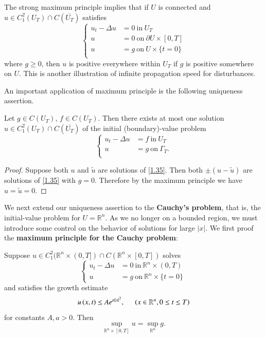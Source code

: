 The strong maximum principle implies that if $U$ is connected and $u\in C_1^2(U_T)\cap C(\overline{U_T})$ satisfies 
\begin{equation}\label{1.35}
\left\{ \begin{aligned}
	u_t-\Delta u&=0\ \text{in}\ U_T\\
	u&=0\ \text{on}\ \partial U\times[0,T]\\
	u&=g\ \text{on}\ U\times\{t=0\}\\
\end{aligned} \right. 
\end{equation}
where $g\ge 0$, then $u$ is positive everywhere within $U_T$ if $g$ is positive somewhere on $U$. This is another illustration of infinite propagation speed for disturbances.\par
An important application of maximum principle is the following uniqueness assertion.
\begin{proposition}
Let $g\in C(U_T)$, $f\in C(U_T)$. Then there exists at most one solution $u\in C_1^2(U_T)\cap C(\overline{U_T})$ of the initial (boundary)-value problem 
\begin{equation}\label{1.99}
\left\{ \begin{aligned}
	u_t-\Delta u&=f\ \text{in}\ U_T\\
	u&=g\ \text{on}\ \Gamma_T.\\
\end{aligned} \right. 
\end{equation}
\end{proposition}
\begin{proof}
Suppose both $u$ and $\widetilde{u}$ are solutions of \eqref{1.35}. Then both $\pm(u-\widetilde{u})$ are solutions of \eqref{1.35} with $g=0$. Therefore by the maximum principle we have $u=\widetilde{u}=0$.
\end{proof}
We next extend our uniqueness assertion to the \textbf{Cauchy's problem}, that is, the initial-value problem for $U=\mathbb{R}^n$. As we no longer on a bounded region, we must introduce some control on the behavior of solutions for large $|x|$. We first proof the \textbf{maximum principle for the Cauchy problem}:
\begin{theorem}\label{Thm1.3.8}
Suppose $u\in C_1^2(\mathbb{R}^n\times(0,T])\cap C(\mathbb{R}^n\times[0,T])$ solves 
$$
\left\{ \begin{aligned}
	u_t-\Delta u&=0\ \text{in}\ \mathbb{R}^n\times(0,T)\\
	u&=g\ \text{on}\ \mathbb{R}^n\times\{t=0\}\
\end{aligned} \right. 
$$
and satisfies the growth estimate 
$$
u\left( x,t \right) \le Ae^{a\left| x \right|^2},\hspace{0.5cm}\left( x\in \mathbb{R} ^n,0\le t\le T \right) 
$$
for constants $A,a>0$. Then 
$$
\mathop {\mathrm{sup}} \limits_{\mathbb{R} ^n\times \left[ 0,T \right]}u=\mathop {\mathrm{sup}} \limits_{\mathbb{R} ^n}g.
$$
\end{theorem}
